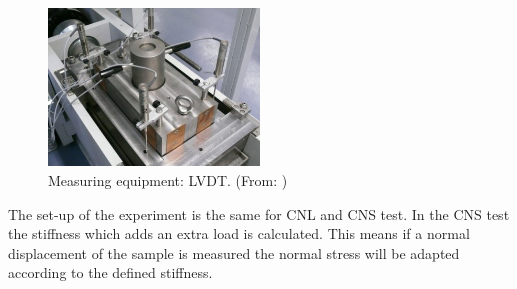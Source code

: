 \begin{figure}[!ht]
\begin{center}
\includegraphics[width=0.5\textwidth]{./figures/ExpCNLLVDT.jpg}
\end{center}
\caption{Measuring equipment: LVDT. (From: \cite{Nguyen2014})}
\label{fig:ExpCNLLVDT}
\end{figure}

The set-up of the experiment is the same for CNL and CNS test. In the CNS test the stiffness which adds an extra load is calculated. This means if a normal displacement of the sample is measured the normal stress will be adapted according to the defined stiffness.



